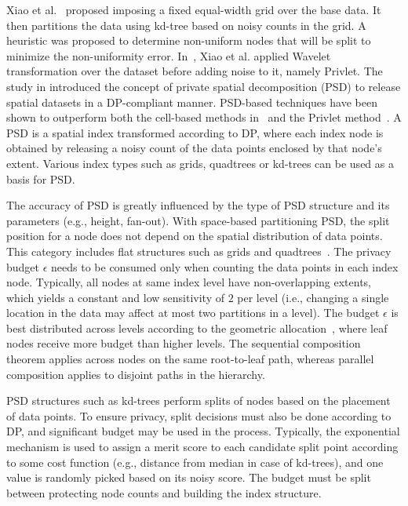 \documentclass{USC-Thesis}
\numberwithin{equation}{chapter}
\begin{document}
Xiao et al.~\cite{xiao2010differentially} proposed imposing a fixed equal-width grid over the base data. It then partitions the data using kd-tree based on noisy counts in the grid. A heuristic was proposed to determine non-uniform nodes that will be split to minimize the non-uniformity error. In~\cite{xiao2011differential}, Xiao et al. applied Wavelet transformation over the dataset before adding noise to it, namely Privlet.
The study in \cite{cormode2012differentially} introduced the concept of private spatial decomposition (PSD) to release spatial datasets in a DP-compliant manner. PSD-based techniques have been shown to outperform both the cell-based methods in~\cite{xiao2010differentially} and the Privlet method~\cite{xiao2011differential}. A PSD is a spatial index transformed according to DP, where each index node is obtained by releasing a noisy count of the data points enclosed by that node's extent. Various index types such as grids, quadtrees or kd-trees \cite{samet2006foundations} can be used as a basis for PSD. 

The accuracy of PSD is greatly influenced by the type of PSD structure and its parameters (e.g., height, fan-out). With space-based partitioning PSD, the split position for a node does not depend on the spatial distribution of data points. This category includes flat structures such as grids
and quadtrees~\cite{samet2006foundations}. The privacy budget $\epsilon$ needs to be consumed only when counting the data points in each index node. Typically, all nodes at same index level have non-overlapping extents, which yields a constant and low sensitivity of $2$ per level (i.e., changing a single location in the data may affect at most two partitions in a level). The budget $\epsilon$ is best distributed across levels according to the geometric allocation~\cite{cormode2012differentially}, where leaf nodes receive more budget than higher levels. The sequential composition theorem applies across nodes on the same root-to-leaf path, whereas parallel composition applies to disjoint paths in the hierarchy.

PSD structures such as kd-trees \cite{cormode2012differentially} perform splits of nodes based on the placement of data points. To ensure privacy, split decisions must also be done according to DP, and significant budget may be used in the process. Typically, the exponential mechanism \cite{cormode2012differentially} is used to assign a merit score to each candidate split point according to some cost function (e.g., distance from median in case of kd-trees), and one value is randomly picked based on its noisy score. The budget must be split between protecting node counts and building the index structure.
\end{document}
